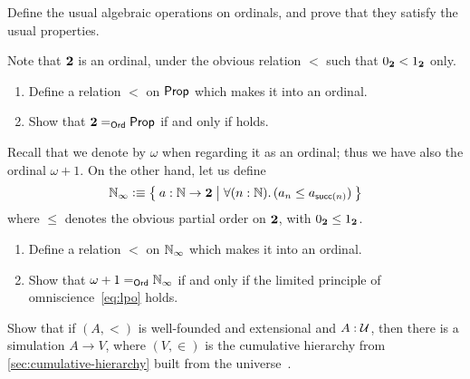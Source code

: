 \documentclass[hott-all.tex]{subfiles}
\begin{document}
% 
\begin{ex}
  Define the usual algebraic operations on ordinals, and prove that they satisfy the usual properties.
\end{ex}
% 
\begin{ex}
  Note that $\bool$ is an ordinal, under the obvious relation $<$ such that $\bfalse<\btrue$ only.
  \begin{enumerate}
  \item Define a relation $<$ on $\prop$ which makes it into an ordinal.
  \item Show that $\id[\ord]\bool\prop$ if and only if \LEM{} holds.
  \end{enumerate}
\end{ex}
% 
\begin{ex}
  Recall that we denote \nat by $\omega$ when regarding it as an ordinal; thus we have also the ordinal $\omega+1$.
  On the other hand, let us define
  \[ \nat_\infty \defeq \setof{a:\nat\to\bool | \fall{n:\nat} (a_n \le a_{\suc(n)}) } \]
  where $\le$ denotes the obvious partial order on $\bool$, with $\bfalse\le\btrue$.
  \begin{enumerate}
  \item Define a relation $<$ on $\nat_\infty$ which makes it into an ordinal.
  \item Show that $\id[\ord]{\omega+1}{\nat_\infty}$ if and only if the limited principle of omniscience~\eqref{eq:lpo} holds.%
  \end{enumerate}
\end{ex}
% 
\begin{ex}
  Show that if $(A,<)$ is well-founded and extensional and $A:\UU$, then there is a simulation $A\to V$, where $(V,\in)$ is the cumulative hierarchy from \cref{sec:cumulative-hierarchy} built from the universe~\UU.
\end{ex}
\end{document}
